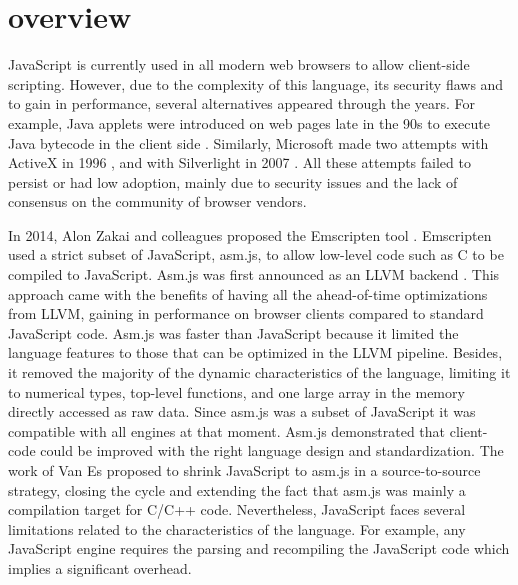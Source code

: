 \section{\wasm overview}
\label{sota:wasm}

\newcommand{\lstnumberautorefname}{Line}
\newcommand{\lineref}[1]{\autoref{#1}}




JavaScript is currently used in all modern web browsers to allow client-side scripting. However, due to the complexity of this language, its security flaws and to gain in performance, several alternatives appeared through the years.  For example, Java applets were introduced on web pages late in the 90s to execute Java bytecode in the client side \cite{javaapplet}. Similarly, Microsoft made two attempts with ActiveX in 1996 \cite{activex}, and with Silverlight in 2007 \cite{silverlight}. All these attempts failed to persist or had low adoption, mainly due to security issues and the lack of consensus on the community of browser vendors.

In 2014, Alon Zakai and colleagues proposed the Emscripten tool \cite{emscripten}. Emscripten used a strict subset of JavaScript, asm.js, to allow low-level code such as C to be compiled to JavaScript. Asm.js was first announced as an LLVM backend \cite{asmjsweb}. This approach came with the benefits of having all the ahead-of-time optimizations from LLVM, gaining in performance on browser clients \cite{asmjs} compared to standard JavaScript code. Asm.js was faster than JavaScript because it limited the language features to those that can be optimized in the LLVM pipeline. Besides, it removed the majority of the dynamic characteristics of the language, limiting it to numerical types, top-level functions, and one large array in the memory directly accessed as raw data. Since asm.js was a subset of JavaScript it was compatible with all engines at that moment. Asm.js demonstrated that client-code could be improved with the right language design and standardization.
The work of Van Es \etal \cite{EsAsm.js} proposed to shrink JavaScript to asm.js in a source-to-source strategy, closing the cycle and extending the fact that asm.js was mainly a compilation target for C/C++ code. 
%
Nevertheless, JavaScript faces several limitations related to the characteristics of the language. For example, any JavaScript engine requires the parsing and recompiling the JavaScript code which implies a significant overhead.


